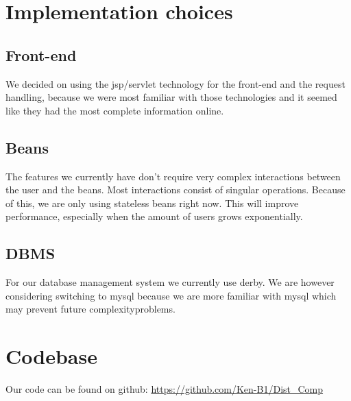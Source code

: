 \documentclass{article}
\begin{document}
\section{Implementation choices}
\subsection{Front-end}
We decided on using the jsp/servlet technology for the front-end and the request handling, because we were most familiar with those technologies and it seemed like they had the most complete information online.

\subsection{Beans}
The features we currently have don't require very complex interactions between the user and the beans. Most interactions consist of singular operations. Because of this, we are only using stateless beans right now. This will improve performance, especially when the amount of users grows exponentially.
\subsection{DBMS}
For our database management system we currently use derby. We are however considering switching to mysql because we are more familiar with mysql which may prevent future complexityproblems.

\section{Codebase}
Our code can be found on github: \url{https://github.com/Ken-B1/Dist_Comp}
\end{document}
